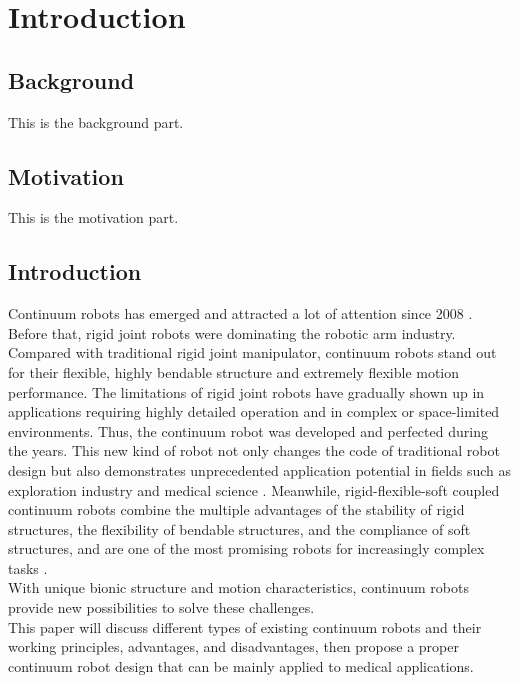 \section{Introduction} 
\subsection{Background}
This is the background part.
\subsection{Motivation}
This is the motivation part.

\subsection{Introduction}
Continuum robots has emerged and attracted a lot of attention since 2008 \cite{review_2008}. Before that, rigid 
joint robots were dominating the robotic arm industry. Compared with traditional rigid joint manipulator, continuum 
robots stand out for their flexible, highly bendable structure and extremely flexible motion performance. The 
limitations of rigid joint robots have gradually shown up in applications requiring highly detailed operation and 
in complex or space-limited environments. Thus, the continuum robot was developed and perfected during the years. 
This new kind of robot not only changes the code of traditional robot design but also demonstrates unprecedented 
application potential in fields such as exploration industry and medical science \cite{CR_medical_application}. 
Meanwhile, rigid-flexible-soft coupled continuum robots combine the multiple advantages of the stability of rigid 
structures, the flexibility of bendable structures, and the compliance of soft structures, and are one of the most 
promising robots for increasingly complex tasks \cite{fishboneCR}. \\
With unique bionic structure and motion characteristics, continuum robots provide new possibilities to solve these 
challenges. \\
This paper will discuss different types of existing continuum robots and their working principles, advantages, 
and disadvantages, then propose a proper continuum robot design that can be mainly applied to medical applications.

\newpage